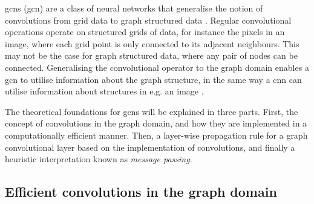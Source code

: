\acrlong{gcn}s (\acrshort{gcn}) are a class of neural networks that generalise the notion of convolutions from grid data to graph structured data \cite{wu_review}. Regular convolutional operations operate on structured grids of data, for instance the pixels in an image, where each grid point is only connected to its adjacent neighbours. This may not be the case for graph structured data, where any pair of nodes can be connected. Generalising the convolutional operator to the graph domain enables a \acrshort{gcn} to utilise information about the graph structure, in the same way a \acrshort{cnn} can utilise information about structures in e.g. an image \cite{wu_review}.

The theoretical foundations for \acrshort{gcn}s will be explained in three parts. First, the concept of convolutions in the graph domain, and how they are implemented in a computationally efficient manner. Then, a layer-wise propagation rule for a graph convolutional layer based on the implementation of convolutions, and finally a heuristic interpretation known as \textit{message passing}.

\subsection{Efficient convolutions in the graph domain}

